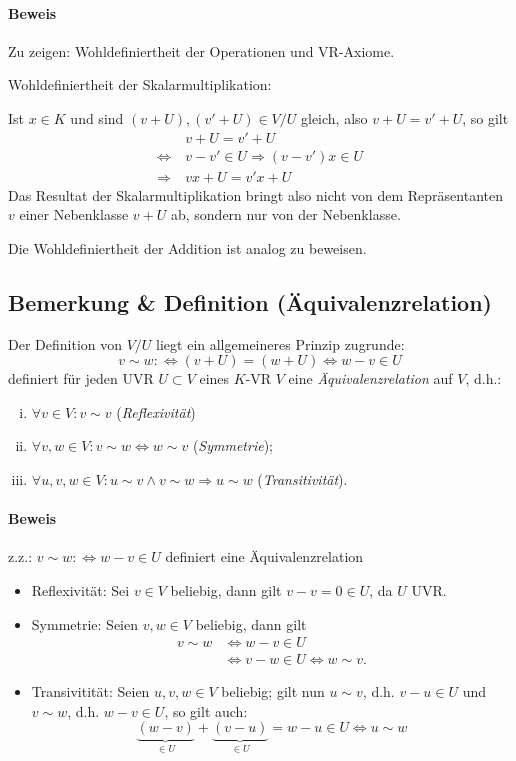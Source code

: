 \paragraph{Beweis}
	Zu zeigen: Wohldefiniertheit der Operationen und VR-Axiome.
	
	Wohldefiniertheit der Skalarmultiplikation:
	
	Ist $x\in K$ und sind $(v+U),(v'+U)\in V/U$ gleich, also $v+U = v'+U$, so gilt
		\begin{align*}
		&v+U = v'+U \\
		\Leftrightarrow\ & v - v'\in U \Rightarrow (v-v')x \in U \\
		\Rightarrow\ & vx+U=v' x+U
		\end{align*}
	Das Resultat der Skalarmultiplikation bringt also nicht von dem Repräsentanten $v$ einer Nebenklasse $v+U$ ab, sondern nur von der Nebenklasse.
	
	Die Wohldefiniertheit der Addition ist analog zu beweisen.

\subsection{Bemerkung \& Definition (Äquivalenzrelation)}
	\begin{Definition}[Äquivalenzrelation]
		Der Definition von $ V/U $ liegt ein allgemeineres Prinzip zugrunde:	
		\[ v\sim w :\Leftrightarrow (v+U)= (w+U) \Leftrightarrow w-v \in U \]
	definiert für jeden UVR $ U\subset V $ eines $ K $-VR $ V $ eine \emph{Äquivalenzrelation} auf $ V $, d.h.:
		\begin{enumerate}[(i)]
			\item $ \forall v\in V: v\sim v $ (\emph{Reflexivität})
			\item $ \forall v,w\in V: v\sim w\Leftrightarrow w\sim v $ (\emph{Symmetrie});
			\item $ \forall u,v,w\in V: u\sim v\land v\sim w\Rightarrow u\sim w $ (\emph{Transitivität}).
		\end{enumerate}
	\end{Definition}

\paragraph{Beweis} z.z.: $ v\sim w:\Leftrightarrow w-v\in U $ definiert eine Äquivalenzrelation
	
	\begin{itemize}
		\item Reflexivität: Sei $ v\in V $ beliebig, dann gilt $ v-v=0\in U $, da $ U $ UVR.
		\item Symmetrie: Seien $ v,w\in V $ beliebig, dann gilt
			\begin{align*}
			v\sim w 	&\Leftrightarrow w-v\in U\\
						&\Leftrightarrow v-w\in U \Leftrightarrow w\sim v.
			\end{align*}
		\item Transivitität: Seien $ u,v,w\in V $ beliebig; gilt nun
			$u\sim v$, d.h. $v-u\in U$ und $v\sim w$, d.h. $w-v\in U$, so gilt auch:
			\[\underbrace{(w-v)}_{\in U}+\underbrace{(v-u)}_{\in U}= w-u\in U \Leftrightarrow u\sim w\]
	\end{itemize}
	
